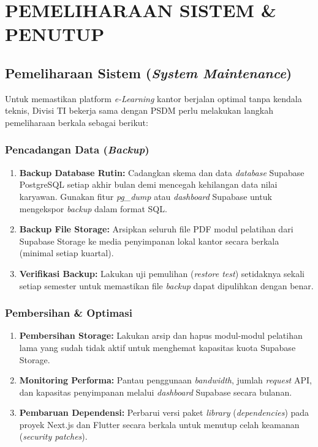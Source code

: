 \chapter{PEMELIHARAAN SISTEM \& PENUTUP}

\section{Pemeliharaan Sistem (\textit{System Maintenance})}
Untuk memastikan platform \textit{e-Learning} kantor berjalan optimal tanpa kendala teknis, Divisi TI bekerja sama dengan PSDM perlu melakukan langkah pemeliharaan berkala sebagai berikut:

\subsection{Pencadangan Data (\textit{Backup})}
\begin{enumerate}
    \item \textbf{Backup Database Rutin:} Cadangkan skema dan data \textit{database} Supabase PostgreSQL setiap akhir bulan demi mencegah kehilangan data nilai karyawan. Gunakan fitur \textit{pg\_dump} atau \textit{dashboard} Supabase untuk mengekspor \textit{backup} dalam format SQL.
    \item \textbf{Backup File Storage:} Arsipkan seluruh file PDF modul pelatihan dari Supabase Storage ke media penyimpanan lokal kantor secara berkala (minimal setiap kuartal).
    \item \textbf{Verifikasi Backup:} Lakukan uji pemulihan (\textit{restore test}) setidaknya sekali setiap semester untuk memastikan file \textit{backup} dapat dipulihkan dengan benar.
\end{enumerate}

\subsection{Pembersihan \& Optimasi}
\begin{enumerate}
    \item \textbf{Pembersihan Storage:} Lakukan arsip dan hapus modul-modul pelatihan lama yang sudah tidak aktif untuk menghemat kapasitas kuota Supabase Storage.
    \item \textbf{Monitoring Performa:} Pantau penggunaan \textit{bandwidth}, jumlah \textit{request} API, dan kapasitas penyimpanan melalui \textit{dashboard} Supabase secara bulanan.
    \item \textbf{Pembaruan Dependensi:} Perbarui versi paket \textit{library} (\textit{dependencies}) pada proyek Next.js dan Flutter secara berkala untuk menutup celah keamanan (\textit{security patches}).
\end{enumerate}


